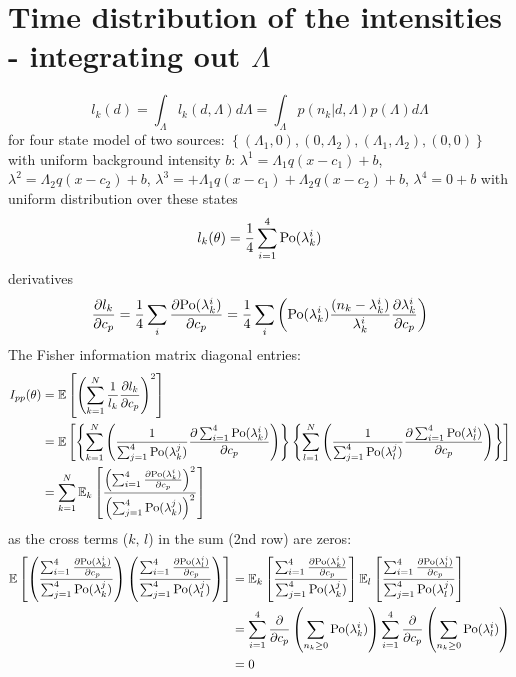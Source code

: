 \section{Time distribution of the intensities - integrating out $\Lambda$}

\begin{equation}
	l_k(d)=\int_{\Lambda}l_k(d,\Lambda)d\Lambda=\int_{\Lambda}p(n_k|d,\Lambda)p(\Lambda)d\Lambda
\end{equation}
%
for four state model of two sources: $\left\{ (\Lambda_1,0),(0,\Lambda_2),(\Lambda_1,\Lambda_2),(0,0)\right\}$ with uniform background intensity $b$: $\lambda^1=\Lambda_1q(x-c_1)+b$, $\lambda^2=\Lambda_2q(x-c_2)+b$, $\lambda^{3}=+\Lambda_1q(x-c_1)+\Lambda_2q(x-c_2)+b$, $\lambda^{4}=0+b$ with uniform distribution over these states
%
\begin{equation}
	l_k(\theta)=\frac{1}{4}\sum_{i=1}^{4}\mathrm{Po}(\lambda_k^i)
\end{equation}
%
derivatives 
%
\begin{equation}
	\frac{\partial l_k}{\partial c_p}=\frac{1}{4}\sum_i\frac{\partial\mathrm{Po}(\lambda_k^i)}{\partial c_p}=\frac{1}{4}\sum_i\left(\mathrm{Po}(\lambda_k^i)\frac{(n_k-\lambda_k^i)}{\lambda_k^i}\frac{\partial\lambda_k^i}{\partial c_p}\right)
\end{equation}
%
The Fisher information matrix diagonal entries:
%
\begin{alignat}{1}
	I_{pp}(\theta) & =\mathbb{E}\left[\left(\sum_{k=1}^N\frac{1}{l_k}\frac{\partial l_k}{\partial c_p}\right)^2\right]\nonumber \\
 	& =\mathbb{E}\left[\left\{ \sum_{k=1}^N\left(\frac{1}{\sum_{j=1}^{4}\mathrm{Po}(\lambda_k^j)}\frac{\partial\sum_{i=1}^{4}\mathrm{Po}(\lambda_k^i)}{\partial c_p}\right)\right\} \left\{ \sum_{l=1}^N\left(\frac{1}{\sum_{j=1}^{4}\mathrm{Po}(\lambda_{l}^j)}\frac{\partial\sum_{i=1}^{4}\mathrm{Po}(\lambda_{l}^i)}{\partial c_p}\right)\right\} \right]\nonumber \\
	& =\sum_{k=1}^N\mathbb{E}_k\left[\frac{\left(\sum_{i=1}^{4}\frac{\partial\mathrm{Po}(\lambda_k^i)}{\partial c_p}\right)^2}{\left(\sum_{j=1}^{4}\mathrm{Po}(\lambda_k^j)\right)^2}\right]
	\label{eq:Fisher Info Integrated Out - diagonal entries}
\end{alignat}
%
as the cross terms ($k,\, l$) in the sum (2nd row) are zeros: 
%
\begin{alignat*}{1}
	\mathbb{E}\left[\left(\frac{\sum_{i=1}^{4}\frac{\partial\mathrm{Po}(\lambda_k^i)}{\partial c_p}}{\sum_{j=1}^{4}\mathrm{Po}(\lambda_k^j)}\right)\left(\frac{\sum_{i=1}^{4}\frac{\partial\mathrm{Po}(\lambda_{l}^i)}{\partial c_p}}{\sum_{j=1}^{4}\mathrm{Po}(\lambda_{l}^j)}\right)\right] & =\mathbb{E}_k\left[\frac{\sum_{i=1}^{4}\frac{\partial\mathrm{Po}(\lambda_k^i)}{\partial c_p}}{\sum_{j=1}^{4}\mathrm{Po}(\lambda_k^j)}\right]\mathbb{E}_{l}\left[\frac{\sum_{i=1}^{4}\frac{\partial\mathrm{Po}(\lambda_{l}^i)}{\partial c_p}}{\sum_{j=1}^{4}\mathrm{Po}(\lambda_{l}^j)}\right]\\
 	& =\sum_{i=1}^{4}\frac{\partial}{\partial c_p}\left(\sum_{n_k\geq0}\mathrm{Po}(\lambda_k^i)\right)\sum_{i=1}^{4}\frac{\partial}{\partial c_p}\left(\sum_{n_k\geq0}\mathrm{Po}(\lambda_{l}^i)\right)\\
 	& =0
\end{alignat*}

